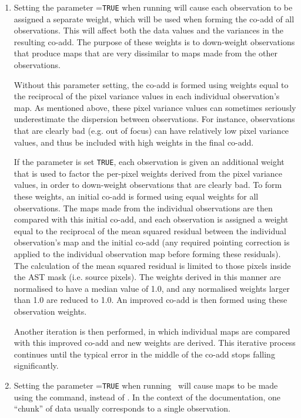 \begin{enumerate}
\item Setting the parameter =\texttt{TRUE} when running
  will cause each observation to be assigned a separate
weight, which will be used when forming the co-add of all observations.
This will affect both the data values and the variances in the resulting
co-add. The purpose of these weights is to down-weight observations that
produce maps that are very dissimilar to maps made from the other observations.

Without this parameter setting, the co-add is formed using weights equal
to the reciprocal of the pixel variance values in each individual
observation's map. As mentioned above, these pixel variance values can
sometimes seriously underestimate the dispersion between observations.
For instance, observations that are clearly bad (e.g. out of focus) can have
relatively low pixel variance values, and thus be included with high weights
in the final co-add.

If the  parameter is set \texttt{TRUE}, each observation
is given an additional weight that is used to factor the per-pixel
weights derived from the pixel variance values, in order to down-weight
observations that are clearly bad. To form these weights, an initial
co-add is formed using equal weights for all observations. The maps made
from the individual observations are then compared with this initial co-add,
and each observation is assigned a weight equal to the reciprocal of the
mean squared residual between the individual observation's map and the
initial co-add (any required pointing correction is applied to the
individual observation map before forming these residuals). The
calculation of the mean squared residual is limited to those pixels
inside the AST mask (i.e. source pixels). The weights derived in this
manner are normalised to have a median value of 1.0, and any normalised
weights larger than 1.0 are reduced to 1.0. An improved co-add is then
formed using these observation weights.

Another iteration is then performed, in which individual maps are compared
with this improved co-add and new weights are derived. This iterative
process continues until the typical error in the middle of the co-add
stops falling significantly.

\item  Setting the parameter =\texttt{TRUE} when running
\poltwomap\ will cause maps to be made using the
 command, instead of
. In the context of the  documentation, one
``chunk'' of data usually corresponds to a single observation.


\end{enumerate}
